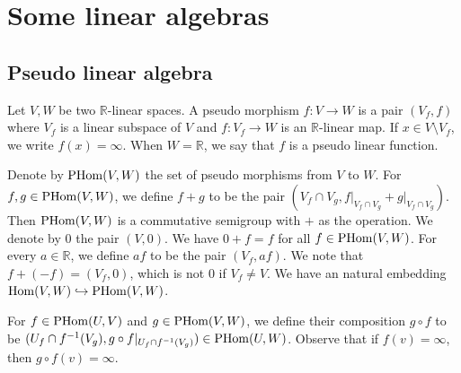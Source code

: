 \documentclass[12pt]{amsart}
\theoremstyle{plain}
\theoremstyle{remark}
\theoremstyle{definition}
\def\R{\mathbb R}
\begin{document}
\section{Some linear algebras}\label{sectionlinear}
\subsection{Pseudo linear algebra}Let $V, W$ be two $\R$-linear spaces. A pseudo morphism $f: V \to W$ is a pair $(V_{f}, f)$ where $V_{f}$ is a linear subspace of $V$ and $f: V_{f} \to W$ is an $\R$-linear map. If $x \in V \setminus V_{f}$, we write $f(x)=\infty$. When $W=\R$, we say that $f$ is a pseudo linear function.\par 
Denote by ${\rm PHom}(V, W)$ the set of pseudo morphisms from $V$ to $W$. For $f, g \in {\rm PHom}(V, W)$, we define $f+g$ to be the pair $(V_{f} \cap V_{g},f\vert_{V_{f} \cap V_{g}}+g\vert_{V_{f} \cap V_{g}})$. Then ${\rm PHom}(V, W)$ is a commutative semigroup with $+$ as the operation. We denote by $0$ the pair $(V, 0)$. We have $0+f=f$ for all $f\in{\rm PHom}(V, W)$. For every $a \in \R$, we define $af$ to be the pair $(V_{f}, a f)$. We note that $f+(-f)=(V_{f}, 0)$, which is not $0$ if $V_f\neq V$. We have an natural embedding ${\rm Hom}(V, W) \hookrightarrow {\rm PHom}(V, W)$.\par 
For $f \in {\rm PHom}(U, V)$ and $ g \in {\rm PHom}(V, W)$, we define their composition $g \circ f$ to be $(U_{f} \cap f^{-1}(V_{g}),g \circ f\vert_{U_{f}\cap f^{-1}(V_{g})})\in{\rm PHom}(U, W)$. Observe that if $f(v)=\infty$, then $g \circ f(v)=\infty$.\par 
\end{document}

